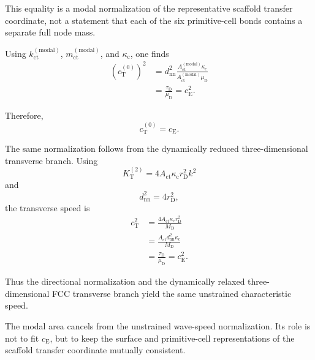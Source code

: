 This equality is a modal normalization of the representative scaffold transfer coordinate, not a statement that each of the six primitive-cell bonds contains a separate full node mass.

Using $k_{\mathrm{ct}}^{(\mathrm{modal})}$, $m_{\mathrm{ct}}^{(\mathrm{modal})}$, and $\kappa_{\mathrm{c}}$, one finds
\begin{equation}
\begin{aligned}
    \left(c_{\mathrm{T}}^{(0)}\right)^2 &= d_{\mathrm{nn}}^2 \frac{A_{\mathrm{ct}}^{(\mathrm{modal})}\kappa_{\mathrm{c}}}{A_{\mathrm{ct}}^{(\mathrm{modal})}\mu_{\mathrm{D}}} \\
    &= \frac{\tau_{\mathrm{D}}}{\mu_{\mathrm{D}}} = c_{\mathrm{E}}^2.
\end{aligned}
\end{equation}

Therefore,
\begin{equation}
    c_{\mathrm{T}}^{(0)} = c_{\mathrm{E}}.
\end{equation}

The same normalization follows from the dynamically reduced three-dimensional transverse branch. Using
\begin{equation}
    K_{\mathrm{T}}^{(2)}
    =
    4A_{\mathrm{ct}}\kappa_{\mathrm{c}}r_{\mathrm{D}}^2k^2
\end{equation}
and
\begin{equation}
    d_{\mathrm{nn}}^2=4r_{\mathrm{D}}^2,
\end{equation}
the transverse speed is
\begin{equation}
\begin{aligned}
    c_{\mathrm{T}}^2
    &=
    \frac{
        4A_{\mathrm{ct}}\kappa_{\mathrm{c}}r_{\mathrm{D}}^2
    }{
        M_{\mathrm{D}}
    }\\
    &=
    \frac{
        A_{\mathrm{ct}}d_{\mathrm{nn}}^2\kappa_{\mathrm{c}}
    }{
        M_{\mathrm{D}}
    }\\
    &=
    \frac{\tau_{\mathrm{D}}}{\mu_{\mathrm{D}}}
    =
    c_{\mathrm{E}}^2.
\end{aligned}
\end{equation}

Thus the directional normalization and the dynamically relaxed three-dimensional FCC transverse branch yield the same unstrained characteristic speed.

The modal area cancels from the unstrained wave-speed normalization. Its role is not to fit $c_{\mathrm{E}}$, but to keep the surface and primitive-cell representations of the scaffold transfer coordinate mutually consistent.


